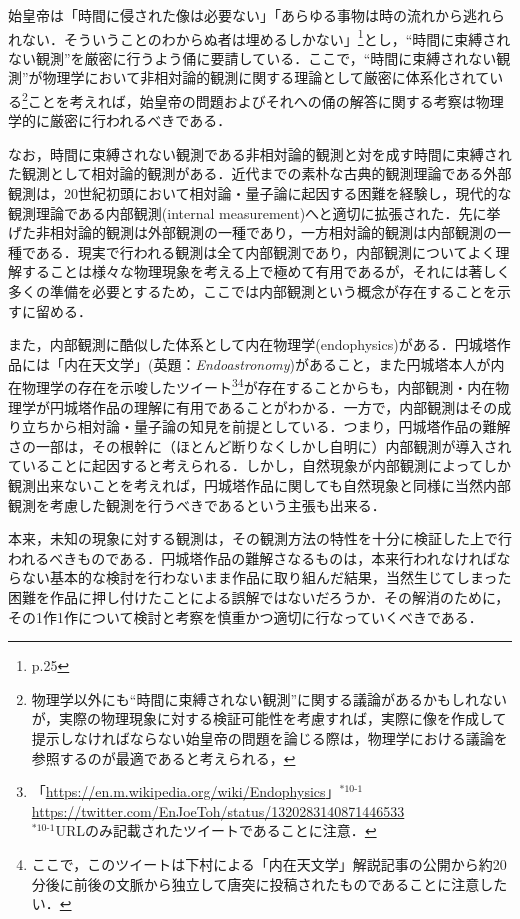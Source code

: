 \documentclass[10pt, a5paper, twoside]{jsarticle}
\theoremstyle{definition}
\begin{document}
			始皇帝は「時間に侵された像は必要ない」「あらゆる事物は時の流れから逃れられない．そういうことのわからぬ者は埋めるしかない」\footnote{\cite{mojika}p.25}とし，“時間に束縛されない観測”を厳密に行うよう俑に要請している\cite{com}．ここで，“時間に束縛されない観測”が物理学において非相対論的観測に関する理論として厳密に体系化されている\footnote{物理学以外にも“時間に束縛されない観測”に関する議論があるかもしれないが，実際の物理現象に対する検証可能性を考慮すれば，実際に像を作成して提示しなければならない始皇帝の問題を論じる際は，物理学における議論を参照するのが最適であると考えられる，}ことを考えれば，始皇帝の問題およびそれへの俑の解答に関する考察は物理学的に厳密に行われるべきである．

			なお，時間に束縛されない観測である非相対論的観測と対を成す時間に束縛された観測として相対論的観測がある．近代までの素朴な古典的観測理論である外部観測は，20世紀初頭において相対論・量子論に起因する困難を経験し，現代的な観測理論である内部観測(internal measurement)へと適切に拡張された．先に挙げた非相対論的観測は外部観測の一種であり，一方相対論的観測は内部観測の一種である．現実で行われる観測は全て内部観測であり，内部観測についてよく理解することは様々な物理現象を考える上で極めて有用であるが，それには著しく多くの準備を必要とするため，ここでは内部観測という概念が存在することを示すに留める．

			また，内部観測に酷似した体系として内在物理学(endophysics)がある．円城塔作品には「内在天文学」(英題：\textit{Endoastronomy})があること，また円城塔本人が内在物理学の存在を示唆したツイート\footnote{「\url{https://en.m.wikipedia.org/wiki/Endophysics}」$^{*10\text{-}1}$\url{https://twitter.com/EnJoeToh/status/1320283140871446533}\\$^{*10\text{-}1}$URLのみ記載されたツイートであることに注意．}\footnote{ここで，このツイートは下村による「内在天文学」解説記事\cite{endo}の公開から約20分後に前後の文脈から独立して唐突に投稿されたものであることに注意したい．}が存在することからも，内部観測・内在物理学が円城塔作品の理解に有用であることがわかる．一方で，内部観測はその成り立ちから相対論・量子論の知見を前提としている．つまり，円城塔作品の難解さの一部は，その根幹に（ほとんど断りなくしかし自明に）内部観測が導入されていることに起因すると考えられる．しかし，自然現象が内部観測によってしか観測出来ないことを考えれば，円城塔作品に関しても自然現象と同様に当然内部観測を考慮した観測を行うべきであるという主張も出来る．

			本来，未知の現象に対する観測は，その観測方法の特性を十分に検証した上で行われるべきものである．円城塔作品の難解さなるものは，本来行われなければならない基本的な検討を行わないまま作品に取り組んだ結果，当然生じてしまった困難を作品に押し付けたことによる誤解ではないだろうか．その解消のために，その1作1作について検討と考察を慎重かつ適切に行なっていくべきである．
\end{document}
